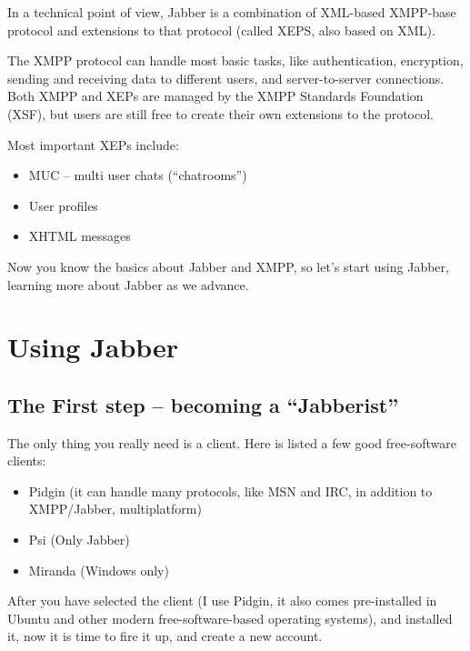 In a technical point of view, Jabber is a combination of XML-based XMPP-base
protocol and extensions to that protocol (called XEPS, also based on XML).

The XMPP protocol can handle most basic tasks, like authentication,
encryption, sending and receiving data to dif\hbox{}ferent users, and
server-to-server connections. Both XMPP and XEPs are managed by the XMPP
Standards Foundation (XSF), but users are still free to create their own
extensions to the protocol.

Most important XEPs include:
\begin{itemize}
    \item{MUC – multi user chats (``chatrooms'')}
    \item{User prof\hbox{}iles}
    \item{XHTML messages}
\end{itemize}

Now you know the basics about Jabber and XMPP, so let's start using Jabber,
learning more about Jabber as we advance.


\section{Using Jabber}
\label{s:jim_client_server:using_jabber}


\subsection{The F\hbox{}irst step – becoming a ``Jabberist''}
\label{ss:jim_client_server:using_jabber:the_first_step}

The only thing you really need is a client. Here is listed a few good
free-software clients:
\begin{itemize}
    \item{Pidgin (it can handle many protocols, like MSN and IRC, in addition to
        XMPP/Jabber, multiplatform)}
    \item{Psi (Only Jabber)}
    \item{Miranda (Windows only)}
\end{itemize}

After you have selected the client (I use Pidgin, it also comes pre-installed in
Ubuntu and other modern free-software-based operating systems), and installed
it, now it is time to f\hbox{}ire it up, and create a new account.

